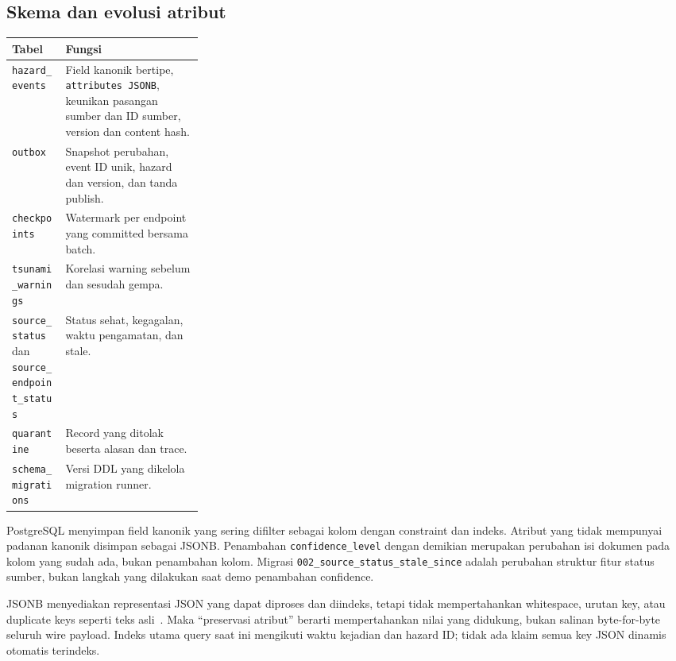 \subsection{Skema dan evolusi atribut}
\begin{tabularx}{\linewidth}{P{0.28\linewidth}Y}
\toprule Tabel & Fungsi\\\midrule
\texttt{hazard\_events} & Field kanonik bertipe, \texttt{attributes JSONB}, keunikan pasangan sumber dan ID sumber, version dan content hash.\\
\texttt{outbox} & Snapshot perubahan, event ID unik, hazard dan version, dan tanda publish.\\
\texttt{checkpoints} & Watermark per endpoint yang committed bersama batch.\\
\texttt{tsunami\_warnings} & Korelasi warning sebelum dan sesudah gempa.\\
\texttt{source\_status} dan \texttt{source\_endpoint\_status} & Status sehat, kegagalan, waktu pengamatan, dan stale.\\
\texttt{quarantine} & Record yang ditolak beserta alasan dan trace.\\
\texttt{schema\_migrations} & Versi DDL yang dikelola migration runner.\\
\bottomrule
\end{tabularx}

PostgreSQL menyimpan field kanonik yang sering difilter sebagai kolom dengan constraint dan indeks. Atribut yang tidak mempunyai padanan kanonik disimpan sebagai JSONB. Penambahan \texttt{confidence\_level} dengan demikian merupakan perubahan isi dokumen pada kolom yang sudah ada, bukan penambahan kolom. Migrasi \texttt{002\_source\_status\_stale\_since} adalah perubahan struktur fitur status sumber, bukan langkah yang dilakukan saat demo penambahan confidence.

JSONB menyediakan representasi JSON yang dapat diproses dan diindeks, tetapi tidak mempertahankan whitespace, urutan key, atau duplicate keys seperti teks asli~\cite{postgres-json}. Maka ``preservasi atribut'' berarti mempertahankan nilai yang didukung, bukan salinan byte-for-byte seluruh wire payload. Indeks utama query saat ini mengikuti waktu kejadian dan hazard ID; tidak ada klaim semua key JSON dinamis otomatis terindeks.


